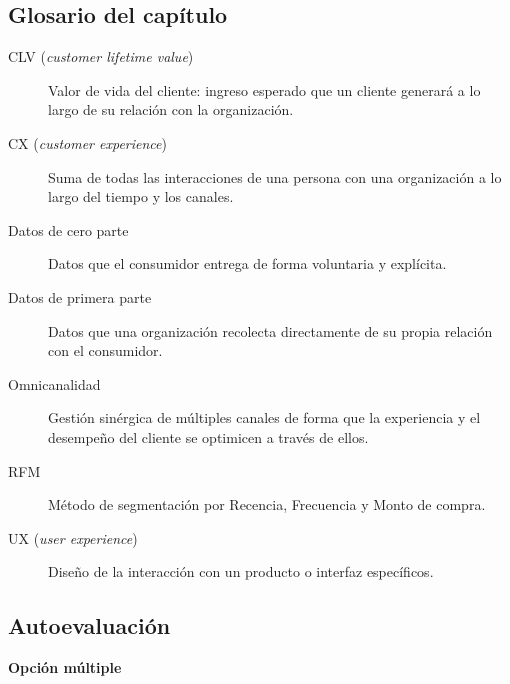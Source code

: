 \subsection*{Glosario del capítulo}
\begin{description}
  \item[CLV (\textit{customer lifetime value})] Valor de vida del cliente:
  ingreso esperado que un cliente generará a lo largo de su relación con la
  organización.
  \item[CX (\textit{customer experience})] Suma de todas las interacciones de
  una persona con una organización a lo largo del tiempo y los canales.
  \item[Datos de cero parte] Datos que el consumidor entrega de forma
  voluntaria y explícita.
  \item[Datos de primera parte] Datos que una organización recolecta
  directamente de su propia relación con el consumidor.
  \item[Omnicanalidad] Gestión sinérgica de múltiples canales de forma que la
  experiencia y el desempeño del cliente se optimicen a través de ellos.
  \item[RFM] Método de segmentación por Recencia, Frecuencia y Monto de
  compra.
  \item[UX (\textit{user experience})] Diseño de la interacción con un
  producto o interfaz específicos.
\end{description}

\subsection*{Autoevaluación}

\textbf{Opción múltiple}

